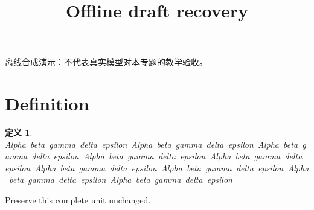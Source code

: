 \documentclass[UTF8,fontset=fandol,11pt]{ctexart}
\title{Offline draft recovery}
\date{}
\newtheorem{definition}{定义}[section]
\begin{document}
\maketitle
\par\noindent 离线合成演示：不代表真实模型对本专题的教学验收。\par
\section{Definition}\label{sec:S01}
\begin{definition}
\mbox{Alpha beta gamma delta epsilon Alpha beta gamma delta epsilon Alpha beta gamma delta epsilon Alpha beta gamma delta epsilon Alpha beta gamma delta epsilon Alpha beta gamma delta epsilon Alpha beta gamma delta epsilon Alpha beta gamma delta epsilon Alpha beta gamma delta epsilon}
\end{definition}
Preserve this complete unit unchanged.\par
\end{document}
